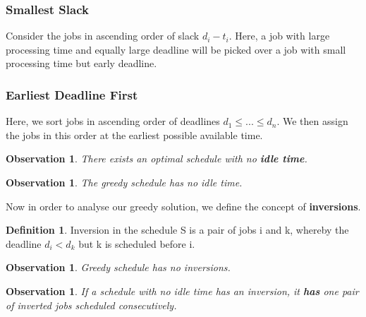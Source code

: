 \documentclass[11pt, oneside]{article}
\newtheorem{observation}[theorem]{\textbf{Observation}}
\theoremstyle{definition}
\newtheorem{definition}{Definition}[section]
\begin{document}
\subsubsection{Smallest Slack}
Consider the jobs in ascending order of slack $d_i - t_i$. Here, a job with large processing time and equally large deadline will be picked over a job with small processing time but early deadline.

\subsubsection{Earliest Deadline First}
Here, we sort jobs in ascending order of deadlines $d_1 \leq ... \leq d_n$. We then assign the jobs in this order at the earliest possible available time.

\begin{observation}
  There exists an optimal schedule with no \textbf{idle time}.
\end{observation}

\begin{observation}
  The greedy schedule has no idle time.
\end{observation}

Now in order to analyse our greedy solution, we define the concept of \textbf{inversions}.

\begin{definition}
  Inversion in the schedule S is a pair of jobs i and k, whereby the deadline $d_i < d_k$ but k is scheduled before i.
\end{definition}

\begin{observation}
  Greedy schedule has no inversions.
\end{observation}

\begin{observation}
  If a schedule with no idle time has an inversion, it \textbf{has} one pair of inverted jobs scheduled consecutively.
\end{observation}
\end{document}
